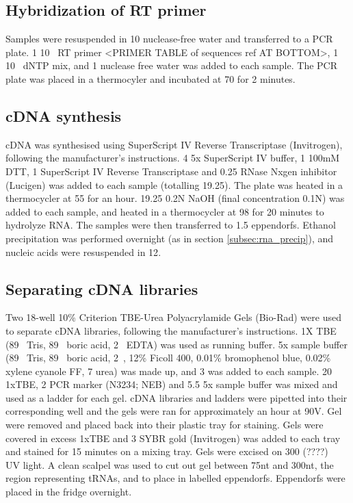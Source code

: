 \subsection{Hybridization of RT primer}
Samples were resuspended in 10\ul{} nuclease-free water and transferred to a PCR plate.
1\ul{} 10\si{\micro\Molar} RT primer <PRIMER TABLE of sequences ref AT BOTTOM>, 1\ul{} 10\si{\micro\Molar} dNTP mix, and 1\ul{} nuclease free water was added to each sample.
The PCR plate was placed in a thermocyler and incubated at 70\C{} for 2 minutes.

\subsection{cDNA synthesis}
cDNA was synthesised using SuperScript IV Reverse Transcriptase (Invitrogen), following the manufacturer's instructions.
4\ul{} 5x SuperScript IV buffer, 1\ul{} 100mM DTT, 1\ul{} SuperScript IV Reverse Transcriptase and 0.25\ul{} RNase Nxgen inhibitor (Lucigen) was added to each sample (totalling 19.25\ul{}).
The plate was heated in a thermocycler at 55\C{} for an hour.
19.25\ul{} 0.2N NaOH (final concentration 0.1N) was added to each sample, and heated in a thermocycler at 98\C{} for 20 minutes to hydrolyze RNA.
The samples were then transferred to 1.5\ml{} eppendorfs.
Ethanol precipitation was performed overnight (as in section \ref{subsec:rna_precip}), and nucleic acids were resuspended in 12\ul{}.

\subsection{Separating cDNA libraries}
Two 18-well 10\% Criterion TBE-Urea Polyacrylamide Gels (Bio-Rad) were used to separate cDNA libraries, following the manufacturer's instructions.
1X TBE (89\si{\milli\Molar} Tris, 89\si{\milli\Molar} boric acid, 2\si{\milli\Molar} EDTA) was used as running buffer.
5x sample buffer (89\si{\milli\Molar} Tris, 89\si{\milli\Molar} boric acid, 2\si{\milli\Molar}, 12\% Ficoll 400, 0.01\% bromophenol blue, 0.02\% xylene cyanole FF, 7\si{\Molar} urea) was made up, and 3\ul{} was added to each sample.
20\ul{} 1xTBE, 2\ul{} PCR marker (N3234; NEB) and 5.5\ul{} 5x sample buffer was mixed and used as a ladder for each gel.
cDNA libraries and ladders were pipetted into their corresponding well and the gels were ran for approximately an hour at 90V.
Gel were removed and placed back into their plastic tray for staining.
Gels were covered in excess 1xTBE and 3\ul{} SYBR gold (Invitrogen) was added to each tray and stained for 15 minutes on a mixing tray.
Gels were excised on 300 (????)\si{\nano\Molar} UV light.
A clean scalpel was used to cut out gel between 75nt and 300nt, the region representing tRNAs, and to place in labelled eppendorfs.
Eppendorfs were placed in the fridge overnight.

